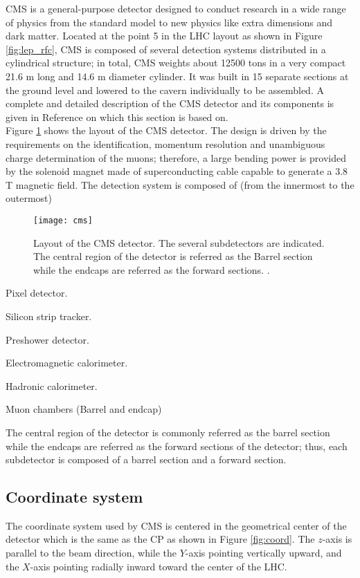 \noindent CMS is a general-purpose detector designed to conduct research in a wide range of physics from the standard model to new physics like extra dimensions and dark matter. Located at the point 5 in the LHC layout as shown in Figure \ref{fig:lep_rfc}, CMS is composed of several detection systems distributed in a cylindrical structure; in total, CMS weights about 12500 tons in a very compact 21.6 m long and 14.6 m diameter cylinder. It was built in 15 separate sections at the ground level and lowered to the cavern individually to be assembled. A complete and detailed description of the CMS detector and its components is given in Reference \cite{cms} on which this section is based on.\\

\noindent Figure \ref{fig:cms} shows the layout of the CMS detector. The design is driven by the requirements on the identification, momentum resolution and unambiguous charge determination of the muons; therefore, a large bending power is provided by the solenoid magnet made of superconducting cable capable to generate a 3.8 T magnetic field. The detection system is composed of (from the innermost to the outermost)

\begin{figure}[!h]
  \centering
  \texttt{[image: cms]}
  \caption[Layout of the CMS detector]{Layout of the CMS detector. The several subdetectors are indicated. The central region of the detector is referred as the Barrel section while the endcaps are referred as the forward sections. \cite{cms_drawing}.}
  \label{fig:cms}
\end{figure}

\noindent 

\bit
\item Pixel detector.
\item Silicon strip tracker.
\item Preshower detector.
\item Electromagnetic calorimeter.
\item Hadronic calorimeter.
\item Muon chambers (Barrel and endcap)
\eit

\noindent The central region of the detector is commonly referred as the barrel section while the endcaps are referred as the forward sections of the detector; thus, each subdetector is composed of a barrel section and a forward section. 


\subsection{Coordinate system}
\noindent The coordinate system used by CMS is centered in the geometrical center of the detector which is the same as the CP as shown in Figure \ref{fig:coord}. The $z$-axis is parallel to the beam direction, while the $Y$-axis pointing vertically upward, and the $X$-axis pointing radially inward toward the center of the LHC.

